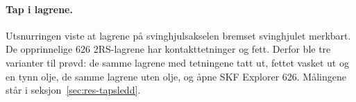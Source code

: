 \paragraph{Tap i lagrene.} Utsnurringen viste at lagrene på svinghjulsakselen bremset svinghjulet merkbart. De opprinnelige 626 2RS-lagrene har kontakttetninger og fett. Derfor ble tre varianter til prøvd: de samme lagrene med tetningene tatt ut, fettet vasket ut og en tynn olje, de samme lagrene uten olje, og åpne SKF Explorer 626. Målingene står i seksjon~\ref{sec:res-tapsledd}.